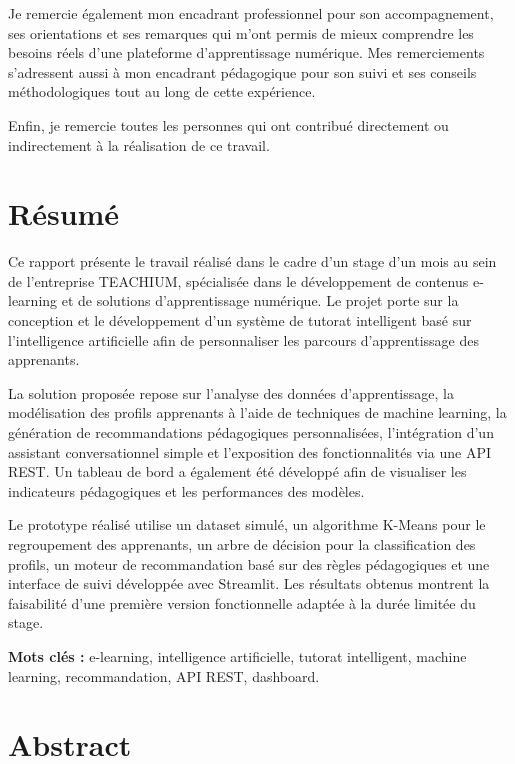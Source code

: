 \documentclass[12pt,a4paper]{report}
\begin{document}
Je remercie également mon encadrant professionnel pour son accompagnement, ses orientations et ses remarques qui m'ont permis de mieux comprendre les besoins réels d'une plateforme d'apprentissage numérique. Mes remerciements s'adressent aussi à mon encadrant pédagogique pour son suivi et ses conseils méthodologiques tout au long de cette expérience.

Enfin, je remercie toutes les personnes qui ont contribué directement ou indirectement à la réalisation de ce travail.

\chapter*{Résumé}

Ce rapport présente le travail réalisé dans le cadre d'un stage d'un mois au sein de l'entreprise TEACHIUM, spécialisée dans le développement de contenus e-learning et de solutions d'apprentissage numérique. Le projet porte sur la conception et le développement d'un système de tutorat intelligent basé sur l'intelligence artificielle afin de personnaliser les parcours d'apprentissage des apprenants.

La solution proposée repose sur l'analyse des données d'apprentissage, la modélisation des profils apprenants à l'aide de techniques de machine learning, la génération de recommandations pédagogiques personnalisées, l'intégration d'un assistant conversationnel simple et l'exposition des fonctionnalités via une API REST. Un tableau de bord a également été développé afin de visualiser les indicateurs pédagogiques et les performances des modèles.

Le prototype réalisé utilise un dataset simulé, un algorithme K-Means pour le regroupement des apprenants, un arbre de décision pour la classification des profils, un moteur de recommandation basé sur des règles pédagogiques et une interface de suivi développée avec Streamlit. Les résultats obtenus montrent la faisabilité d'une première version fonctionnelle adaptée à la durée limitée du stage.

\textbf{Mots clés :} e-learning, intelligence artificielle, tutorat intelligent, machine learning, recommandation, API REST, dashboard.

\chapter*{Abstract}
\end{document}

